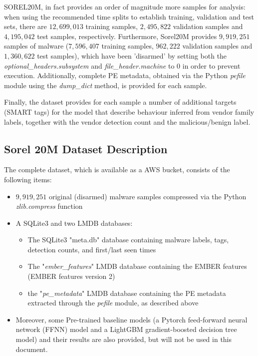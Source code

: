 \documentclass[pdfa%
,cucitura%
]{toptesi}
\begin{document}
SOREL20M, in fact provides an order of magnitude more samples for analysis: when using the recommended time splits to establish training, validation and test sets, there are $12,699,013$ training samples, $2,495,822$ validation samples and $4,195,042$ test samples, respectively. Furthermore, Sorel20M \cite{HarangSOREL20M} provides $9,919,251$ samples of malware ($7,596,407$ training samples, $962,222$ validation samples and $1,360,622$ test samples), which have been 'disarmed' by setting both the \textit{optional\_headers.subsystem} and \textit{file\_header.machine} to 0 in order to prevent execution. Additionally, complete PE metadata, obtained via the Python \textit{pefile} module using the \textit{dump\_dict} method, is provided for each sample.

Finally, the dataset provides for each sample a number of additional targets (SMART tags) for the model that describe behaviour inferred from vendor family labels, together with the vendor detection count and the malicious/benign label.

\subsection{Sorel 20M Dataset Description}

The complete dataset, which is available as a AWS bucket, consists of the following items:
\begin{itemize}
	\item $9,919,251$ original (disarmed) malware samples compressed via the Python \textit{zlib.compress} function
	
	\item A SQLite3 and two LMDB databases:
	\begin{itemize}
		\item The SQLite3 "meta.db" database containing malware labels, tags, detection counts, and first/last seen times
		
		\item The "\textit{ember\_features}" LMDB database containing the EMBER features (EMBER features version 2)
		
		\item the "\textit{pe\_metadata}" LMDB database containing the PE metadata extracted through the \textit{pefile} module, as described above
	\end{itemize}

	\item Moreover, some Pre-trained baseline models (a Pytorch feed-forward neural network (FFNN) model and a LightGBM gradient-boosted decision tree model) and their results are also provided, but will not be used in this document.
\end{itemize}
\end{document}
